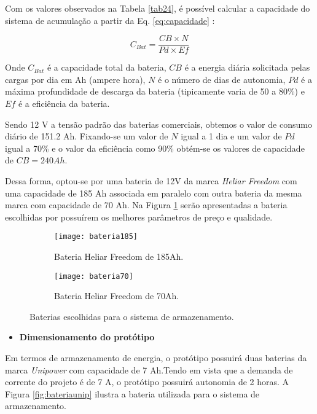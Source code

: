 Com os valores observados na Tabela \ref{tab24}, é possível calcular a capacidade do sistema de acumulação a partir da Eq. \ref{eq:capacidade} \cite{alan}:

\begin{equation}
    C_{Bat} = \frac{CB \times N}{Pd \times Ef}
    \label{eq:capacidade}
\end{equation}




Onde $C_{Bat}$ é a capacidade total da bateria, $CB$ é a energia diária solicitada pelas cargas por dia em Ah (ampere hora), $N$ é o número de dias de autonomia, $Pd$ é a máxima profundidade de descarga da bateria (tipicamente varia de 50 a 80\%) e $Ef$ é a eficiência da bateria.

Sendo 12 V a tensão padrão das baterias comerciais, obtemos o valor de consumo diário de 151.2 Ah. Fixando-se um valor de $N$ igual a 1 dia e um valor de $Pd$ igual a 70\% e o valor da eficiência como 90\% obtém-se os valores de capacidade de $CB = 240 Ah$. 


Dessa forma, optou-se por uma bateria de 12V da marca \textit{Heliar Freedom} com uma capacidade de 185 Ah associada em paralelo com outra bateria da mesma marca com capacidade de 70 Ah. Na Figura \ref{fig:bateria} serão apresentadas a bateria escolhidas por possuírem os melhores parâmetros de preço e qualidade.


\begin{figure}[H]

    \centering
      \begin{subfigure}{0.45\textwidth}
        \texttt{[image: bateria185]}
        \caption{Bateria Heliar Freedom de 185Ah.}
      \end{subfigure}
      \hfill
      \begin{subfigure}{0.35\textwidth}
        \texttt{[image: bateria70]}
        \caption{Bateria Heliar Freedom de 70Ah.}
      \end{subfigure}
    \caption{Baterias escolhidas para o sistema de armazenamento.}
    \label{fig:bateria}
\end{figure}


    \begin{itemize}
        \item \textbf{Dimensionamento do protótipo}
    \end{itemize}
    
    Em termos de armazenamento de energia, o protótipo possuirá duas baterias da marca \textit{Unipower} com capacidade de 7 Ah.Tendo em vista que a demanda de corrente do projeto é de 7 A, o protótipo possuirá autonomia de 2 horas. A Figura \ref{fig:bateriaunip} ilustra a bateria utilizada para o sistema de armazenamento.
    

